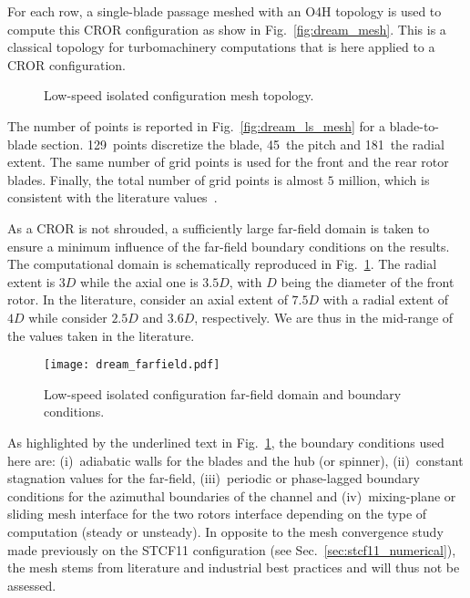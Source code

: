 
For each row, a single-blade passage meshed
with an O4H topology is used to compute this
CROR configuration as show in Fig.~\ref{fig:dream_mesh}. This is a classical
topology for turbomachinery computations that is here applied to 
a CROR configuration.
\begin{figure}[htp]
  \centering
  \caption{Low-speed isolated configuration mesh topology.}
\end{figure}
The number of points is reported in 
Fig.~\ref{fig:dream_ls_mesh} for a blade-to-blade section. 
129~points discretize the blade, 45~the pitch and 181~the radial
extent. The same number of grid points is used for the front
and the rear rotor blades. 
Finally, the total number of grid points is almost $5$ million, which
is consistent with the literature values~\cite{Stuermer2008,Bechet2011,
Francois2013,Zachariadis2011,Peters2012}.

As a CROR is not shrouded, a sufficiently large
far-field domain is taken to ensure a minimum influence
of the far-field boundary conditions on the results.
The computational domain is schematically reproduced 
in Fig.~\ref{fig:dream_farfield}.
The radial extent is $3D$ while the axial one is $3.5D$, with
$D$ being the diameter of the front rotor.
In the literature, 
\citet{Peters2012} consider an axial extent of $7.5D$
with a radial extent of $4D$ while \citet{Zachariadis2011}
consider $2.5D$ and $3.6D$, respectively. We are thus in 
the mid-range of the values taken in the literature.
\begin{figure}[htp]
  \centering
  \texttt{[image: dream\_farfield.pdf]}
  \caption{Low-speed isolated configuration far-field domain and boundary conditions.}
  \label{fig:dream_farfield}
\end{figure}
As highlighted by the underlined text in Fig.~\ref{fig:dream_farfield},
the boundary conditions used here are: (i)~adiabatic walls
for the blades and the hub (or spinner), (ii)~constant
stagnation values for the far-field, (iii)~periodic
or phase-lagged boundary conditions 
for the azimuthal boundaries of the channel
and (iv)~mixing-plane or sliding mesh interface for the
two rotors interface depending on the type of computation (steady or unsteady).
In opposite to the mesh convergence study made previously on the STCF11
configuration (see Sec.~\ref{sec:stcf11_numerical}),
the mesh stems from literature and industrial best
practices and will thus not be assessed.

